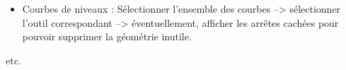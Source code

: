\documentclass[a4paper,12pt,french]{sphinxmanual}
\begin{document}
\begin{itemize}
\begin{description}
\begin{itemize}
\begin{description}
\begin{itemize}
\item {} 
Courbes de niveaux : Sélectionner l'ensemble des courbes --\textgreater{} sélectionner l'outil correspondant --\textgreater{} éventuellement, afficher les arrêtes cachées pour pouvoir supprimer la géométrie inutile.

\end{itemize}

\end{description}

\end{itemize}

\end{description}

\end{itemize}

etc.


\end{document}
